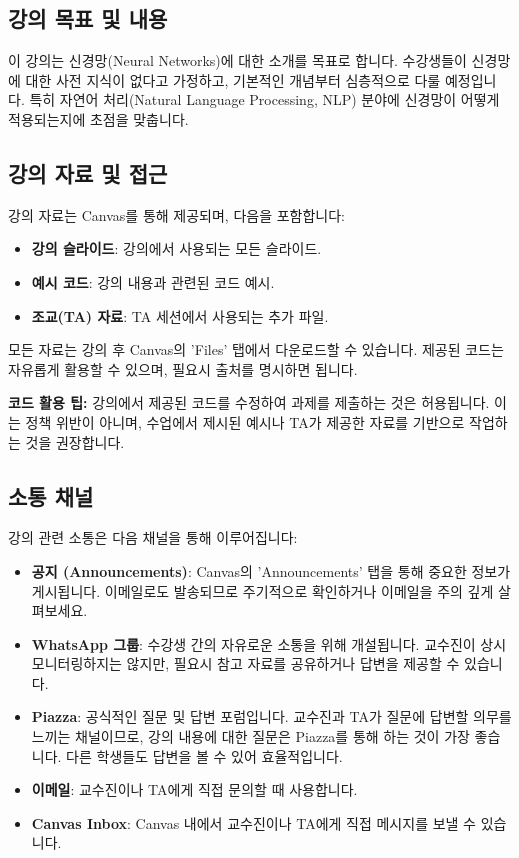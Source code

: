 \documentclass[11pt,a4paper]{article}
\begin{document}
\subsection*{강의 목표 및 내용}
이 강의는 신경망(Neural Networks)에 대한 소개를 목표로 합니다.
수강생들이 신경망에 대한 사전 지식이 없다고 가정하고, 기본적인 개념부터 심층적으로 다룰 예정입니다.
특히 자연어 처리(Natural Language Processing, NLP) 분야에 신경망이 어떻게 적용되는지에 초점을 맞춥니다.

\subsection*{강의 자료 및 접근}
강의 자료는 Canvas를 통해 제공되며, 다음을 포함합니다:
\begin{itemize}
    \item \textbf{강의 슬라이드}: 강의에서 사용되는 모든 슬라이드.
    \item \textbf{예시 코드}: 강의 내용과 관련된 코드 예시.
    \item \textbf{조교(TA) 자료}: TA 세션에서 사용되는 추가 파일.
\end{itemize}
모든 자료는 강의 후 Canvas의 'Files' 탭에서 다운로드할 수 있습니다.
제공된 코드는 자유롭게 활용할 수 있으며, 필요시 출처를 명시하면 됩니다.

\begin{tipbox}
\textbf{코드 활용 팁:}
강의에서 제공된 코드를 수정하여 과제를 제출하는 것은 허용됩니다.
이는 정책 위반이 아니며, 수업에서 제시된 예시나 TA가 제공한 자료를 기반으로 작업하는 것을 권장합니다.
\end{tipbox}

\subsection*{소통 채널}
강의 관련 소통은 다음 채널을 통해 이루어집니다:
\begin{itemize}
    \item \textbf{공지 (Announcements)}: Canvas의 'Announcements' 탭을 통해 중요한 정보가 게시됩니다. 이메일로도 발송되므로 주기적으로 확인하거나 이메일을 주의 깊게 살펴보세요.
    \item \textbf{WhatsApp 그룹}: 수강생 간의 자유로운 소통을 위해 개설됩니다. 교수진이 상시 모니터링하지는 않지만, 필요시 참고 자료를 공유하거나 답변을 제공할 수 있습니다.
    \item \textbf{Piazza}: 공식적인 질문 및 답변 포럼입니다. 교수진과 TA가 질문에 답변할 의무를 느끼는 채널이므로, 강의 내용에 대한 질문은 Piazza를 통해 하는 것이 가장 좋습니다. 다른 학생들도 답변을 볼 수 있어 효율적입니다.
    \item \textbf{이메일}: 교수진이나 TA에게 직접 문의할 때 사용합니다.
    \item \textbf{Canvas Inbox}: Canvas 내에서 교수진이나 TA에게 직접 메시지를 보낼 수 있습니다.
\end{itemize}
\end{document}
